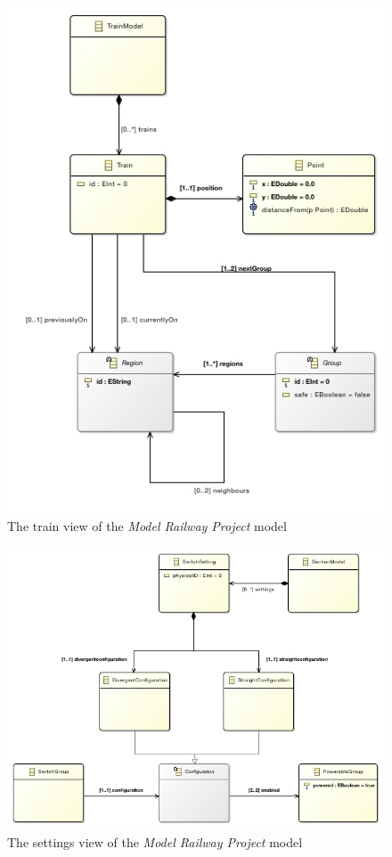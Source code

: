 \newpage
\begin{figure}[H]
	\centering
	\includegraphics[width=1.0\linewidth]{include/figures/chapter_6/metamodels/trainmodel}
	\caption{The train view of the \emph{Model Railway Project} model} 
	\label{fig:case_study:trainmodel}
\end{figure}
\newpage
\begin{figure}[H]
	\centering
	\includegraphics[width=1.2\linewidth]{include/figures/chapter_6/metamodels/settingmodel}
	\caption{The settings view of the \emph{Model Railway Project} model} 
	\label{fig:case_study:settingmodel}
\end{figure}

